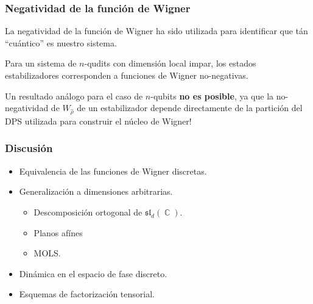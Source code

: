 \documentclass[10pt,spanish]{beamer}
\DeclareMathOperator{\C}{\mathbb{C}}
\begin{document}
  \begin{frame}
    \frametitle{Negatividad de la función de Wigner}

    La negatividad de la función de Wigner ha sido
    utilizada para identificar que tán ``cuántico'' es
    nuestro sistema.

    \vspace{5pt}


    \begin{theorem}
      Para un sistema de $n$-qudits con dimensión local
      impar, los estados estabilizadores corresponden a
      funciones de Wigner no-negativas.
    \end{theorem}

    \vspace{5pt}

    \pause

    Un resultado análogo para el caso de $n$-qubits
    \textbf{no es posible}, ya que la no-negatividad de
    $W_{\hat\rho}$ de un estabilizador depende directamente
    de la partición del DPS utilizada para construir el
    núcleo de Wigner!
    
  \end{frame}

  \begin{frame}
    \frametitle{Discusión}

    \begin{itemize}
      \item Equivalencia de las funciones de Wigner
        discretas.
      \pause
      \item Generalización a dimensiones arbitrarias.
        \begin{itemize}
          \item Descomposición ortogonal de
            $\mathfrak{sl}_d(\C)$.
          \item Planos afínes
          \item MOLS.
        \end{itemize}
      \pause
      \item Dinámica en el espacio de fase discreto.
      \pause
      \item Esquemas de factorización tensorial.
    \end{itemize}
  \end{frame}
\end{document}
